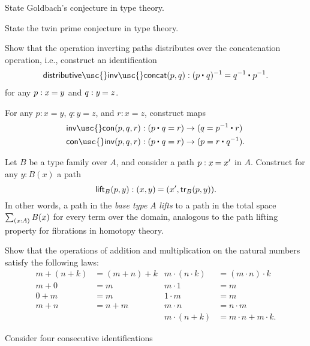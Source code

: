 \begin{exercises}
\item
  \begin{subexenum}
  \item State Goldbach's conjecture in type theory.
  \item State the twin prime conjecture in type theory.
  \end{subexenum}
\item \label{ex:inv_assoc}Show that the operation inverting paths distributes over the concatenation operation, i.e., construct an identification
  \begin{align*}
    \mathsf{distributive\usc{}inv\usc{}concat}(p,q):\id{(\ct{p}{q})^{-1}}{\ct{q^{-1}}{p^{-1}}}.
  \end{align*}
  for any $p:\id{x}{y}$ and $q:\id{y}{z}$.
\item \label{ex:inv_con}For any $p:x=y$, $q:y=z$, and $r:x=z$, construct maps
  \begin{align*}
    \mathsf{inv\usc{}con}(p,q,r) & : (\ct{p}{q}=r)\to (q=\ct{p^{-1}}{r}) \\
    \mathsf{con\usc{}inv}(p,q,r) & : (\ct{p}{q}=r)\to (p=\ct{r}{q^{-1}}).
  \end{align*}
\item Let $B$ be a type family over $A$, and consider a path $p:\id{x}{x'}$ in $A$. Construct for any $y:B(x)$ a path
  \begin{equation*}
    \mathsf{lift}_B(p,y) : \id{\pairr{x,y}}{\pairr{x',\mathsf{tr}_B(p,y)}}.
  \end{equation*}
  In other words, a path in the \emph{base type} $A$ \emph{lifts} to a path in the total space $\sm{x:A}B(x)$ for every term over the domain, analogous to the path lifting property for fibrations in homotopy theory.
\item \label{ex:semi-ring-laws-N}Show that the operations of addition and multiplication on the natural numbers satisfy the following laws:
  \begin{align*}
    m+(n+k) & =(m+n)+k & m\cdot (n\cdot k) & = (m\cdot n)\cdot k \\
    m+0 & = m & m\cdot 1 & = m \\
    0+m & = m & 1\cdot m & = m \\
    m+n & = n+m & m\cdot n & = n\cdot m\\
    & & m\cdot (n+k) & = m\cdot n + m\cdot k.
  \end{align*}
\item Consider four consecutive identifications
  \begin{equation*}

\end{equation*}
\end{exercises}
